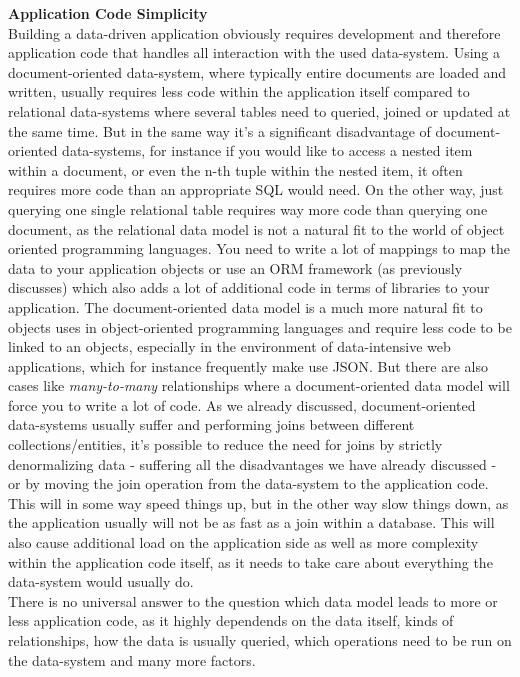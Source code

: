 {\textbf{Application Code Simplicity}\\
Building a data-driven application obviously requires development and therefore application code that handles all interaction with the used data-system. Using a document-oriented data-system, where typically entire documents are loaded and written, usually requires less code within the application itself compared to relational data-systems where several tables need to queried, joined or updated at the same time. But in the same way it's a significant disadvantage of document-oriented data-systems, for instance if you would like to access a nested item within a document, or even the n-th tuple within the nested item, it often requires more code than an appropriate SQL would need. 
On the other way, just querying one single relational table requires way more code than querying one document, as the relational data model is not a natural fit to the world of object oriented programming languages. You need to write a lot of mappings to map the data to your application objects or use an ORM framework (as previously discusses) which also adds a lot of additional code in terms of libraries to your application. The document-oriented data model is a much more natural fit to objects uses in object-oriented programming languages and require less code to be linked to an objects, especially in the environment of data-intensive web applications, which for instance frequently make use JSON.
But there are also cases like \textit{many-to-many} relationships where a document-oriented data model will force you to write a lot of code. As we already discussed, document-oriented data-systems usually suffer and performing joins between different collections/entities, it's possible to reduce the need for joins by strictly denormalizing data - suffering all the disadvantages we have already discussed - or by moving the join operation from the data-system to the application code. This will in some way speed things up, but in the other way slow things down, as the application usually will not be as fast as a join within a database. This will also cause additional load on the application side as well as more complexity within the application code itself, as it needs to take care about everything the data-system would usually do.\\

There is no universal answer to the question which data model leads to more or less application code, as it highly dependends on the data itself, kinds of relationships, how the data is usually queried, which operations need to be run on the data-system and many more factors.


}
